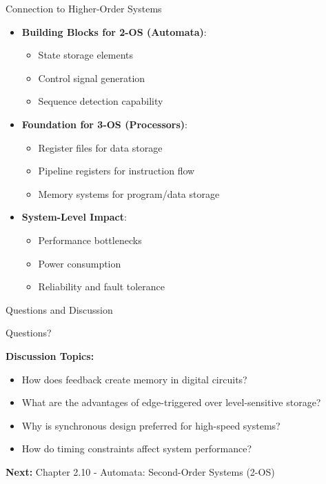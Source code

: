 \documentclass[aspectratio=169,11pt]{beamer}
\newcommand{\concept}[1]{\textbf{\color{accentcolor}#1}}
\begin{document}
\begin{frame}{Connection to Higher-Order Systems}
\begin{itemize}
\item \concept{Building Blocks for 2-OS (Automata)}:
\begin{itemize}
\item State storage elements
\item Control signal generation
\item Sequence detection capability
\end{itemize}
\vspace{0.3cm}
\item \concept{Foundation for 3-OS (Processors)}:
\begin{itemize}
\item Register files for data storage
\item Pipeline registers for instruction flow
\item Memory systems for program/data storage
\end{itemize}
\vspace{0.3cm}
\item \concept{System-Level Impact}:
\begin{itemize}
\item Performance bottlenecks
\item Power consumption
\item Reliability and fault tolerance
\end{itemize}
\end{itemize}
\end{frame}

\begin{frame}{Questions and Discussion}
\begin{center}
\Large
Questions?

\vspace{1cm}

\normalsize
\textbf{Discussion Topics:}
\begin{itemize}
\item How does feedback create memory in digital circuits?
\item What are the advantages of edge-triggered over level-sensitive storage?
\item Why is synchronous design preferred for high-speed systems?
\item How do timing constraints affect system performance?
\end{itemize}

\vspace{0.5cm}
\textbf{Next:} Chapter 2.10 - Automata: Second-Order Systems (2-OS)
\end{center}
\end{frame}
\end{document}
